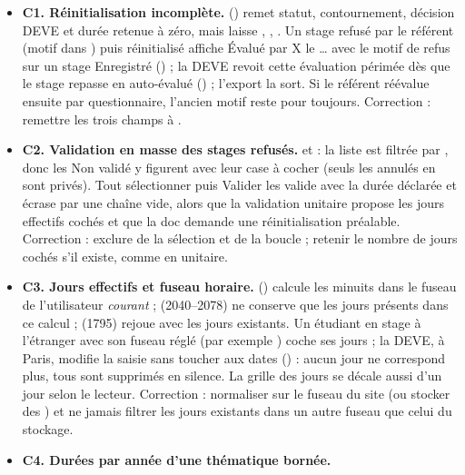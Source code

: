 \documentclass[11pt,a4paper]{article}
\newcommand{\grav}[1]{\textbf{\textcolor{#1}{\textbullet}}}
\newcommand{\maj}{\grav{orange}}
\begin{document}
\begin{itemize}
  \item[\maj] \textbf{C1. Réinitialisation incomplète.} 
    () remet statut, contournement, décision DEVE et durée retenue à
    zéro, mais laisse , , . Un stage refusé
    par le référent (motif dans ) puis réinitialisé affiche \og Évalué par X le
    \dots\fg{} avec le motif de refus sur un stage \og Enregistré\fg{} () ; la DEVE revoit cette évaluation périmée dès que le stage repasse en auto-évalué
    () ; l'export la sort. Si le référent réévalue ensuite par
    questionnaire, l'ancien motif reste pour toujours. Correction : remettre les trois champs à
    .
  \item[\maj] \textbf{C2. Validation en masse des stages refusés.}  et
     : la liste est filtrée par , donc les \og Non validé\fg{}
    y figurent avec leur case à cocher (seuls les annulés en sont privés). \og Tout
    sélectionner\fg{} puis \og Valider\fg{} les valide avec la durée déclarée et écrase
     par une chaîne vide, alors que la validation unitaire propose les jours
    effectifs cochés et que la doc demande une réinitialisation préalable. Correction : exclure
     de la sélection et de la boucle ; retenir le nombre de jours cochés s'il
    existe, comme en unitaire.
  \item[\maj] \textbf{C3. Jours effectifs et fuseau horaire.} 
    () calcule les minuits dans le fuseau de l'utilisateur
    \emph{courant} ;  (2040--2078) ne conserve que les jours
    présents dans ce calcul ;  (1795) rejoue
     avec les jours existants. Un étudiant en stage à l'étranger
    avec son fuseau réglé (par exemple ) coche ses jours ; la DEVE, à
    Paris, modifie la saisie sans toucher aux dates () : aucun jour
    ne correspond plus, tous sont supprimés en silence. La grille des jours se décale aussi d'un
    jour selon le lecteur. Correction : normaliser sur le fuseau du site (ou stocker des
    ) et ne jamais filtrer les jours existants dans un autre fuseau que celui du
    stockage.
  \item[\maj] \textbf{C4. Durées par année d'une thématique bornée.}

\end{itemize}
\end{document}
